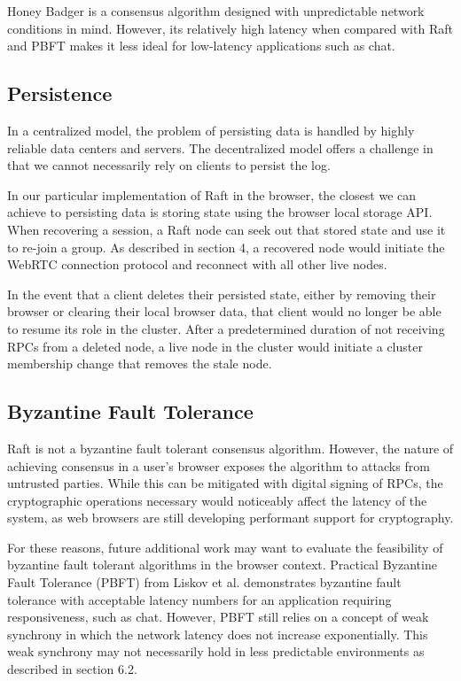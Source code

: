 \documentclass[11pt,twocolumn]{article}
\begin{document}
Honey Badger is a consensus algorithm designed with unpredictable network conditions in mind. However, its relatively high latency when compared with Raft and PBFT makes it less ideal for low-latency applications such as chat.

\subsection{Persistence}
In a centralized model, the problem of persisting data is handled by highly reliable data centers and servers. The decentralized model offers a challenge in that we cannot necessarily rely on clients to persist the log.

In our particular implementation of Raft in the browser, the closest we can achieve to persisting data is storing state using the browser local storage API. When recovering a session, a Raft node can seek out that stored state and use it to re-join a group. As described in section 4, a recovered node would initiate the WebRTC connection protocol and reconnect with all other live nodes.

In the event that a client deletes their persisted state, either by removing their browser or clearing their local browser data, that client would no longer be able to resume its role in the cluster. After a predetermined duration of not receiving RPCs from a deleted node, a live node in the cluster would initiate a cluster membership change that removes the stale node.

\subsection{Byzantine Fault Tolerance}
Raft is not a byzantine fault tolerant consensus algorithm. However, the nature of achieving consensus in a user's browser exposes the algorithm to attacks from untrusted parties. While this can be mitigated with digital signing of RPCs, the cryptographic operations necessary would noticeably affect the latency of the system, as web browsers are still developing performant support for cryptography.

For these reasons, future additional work may want to evaluate the feasibility of byzantine fault tolerant algorithms in the browser context. Practical Byzantine Fault Tolerance (PBFT) from Liskov et al. demonstrates byzantine fault tolerance with acceptable latency numbers for an application requiring responsiveness, such as chat. However, PBFT still relies on a concept of weak synchrony in which the network latency does not increase exponentially. This weak synchrony may not necessarily hold in less predictable environments as described in section 6.2.
\end{document}
